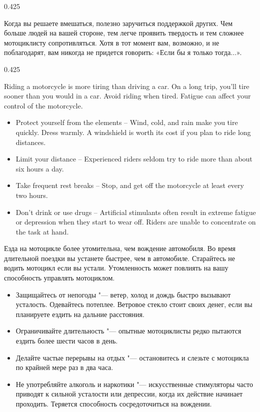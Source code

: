 \begin{langblock}{0.425}
\begin{rus}
		Когда вы решаете вмешаться, полезно заручиться поддержкой других. Чем больше людей на вашей стороне, тем легче проявить твердость и тем сложнее мотоциклисту сопротивляться. Хотя в тот момент вам, возможно, и не поблагодарят, вам никогда не придется говорить: «Если бы я только тогда...».
\end{rus}
\end{langblock}


\clearpage
{}

\begin{langblock}{0.425}
	\begin{eng}
	
	Riding a motorcycle is more tiring than driving a car. On a long trip, you'll tire sooner than you would in a car. Avoid riding when tired.  Fatigue can affect your control of the motorcycle.
	
	\begin{itemize}[noitemsep]
		\item Protect yourself from the elements -- Wind, cold, and rain make you tire quickly. Dress warmly. A windshield is worth its cost if you plan to ride long distances.
		\item Limit your distance -- Experienced riders seldom try to ride more than about six hours a day.
		\item Take frequent rest breaks -- Stop, and get off the motorcycle at least every two hours.
		\item Don't drink or use drugs -- Artificial stimulants often result in extreme fatigue or depression when they start to wear off. Riders are unable to concentrate on the task at hand.
	\end{itemize}
	\end{eng}
	\begin{rus}
		
		Езда на мотоцикле более утомительна, чем вождение автомобиля. Во время длительной поездки вы устанете быстрее, чем в автомобиле. Старайтесь не водить мотоцикл если вы устали.  Утомленность может повлиять на вашу способность управлять мотоциклом.
		
		\begin{itemize}[noitemsep]
			\item Защищайтесь от непогоды "--- ветер, холод и дождь быстро вызывают усталость. Одевайтесь потеплее. Ветровое стекло стоит своих денег, если вы планируете ездить на дальние расстояния.
			\item Ограничивайте длительность "--- опытные мотоциклисты редко пытаются ездить более шести часов в день.
			\item Делайте частые перерывы на отдых "--- остановитесь и слезьте с мотоцикла по крайней мере раз в два часа.
			\item Не употребляйте алкоголь и наркотики "--- искусственные стимуляторы часто приводят к сильной усталости или депрессии, когда их действие начинает проходить. Теряется способность сосредоточиться на вождении.
		\end{itemize}
\end{rus}
\end{langblock}






